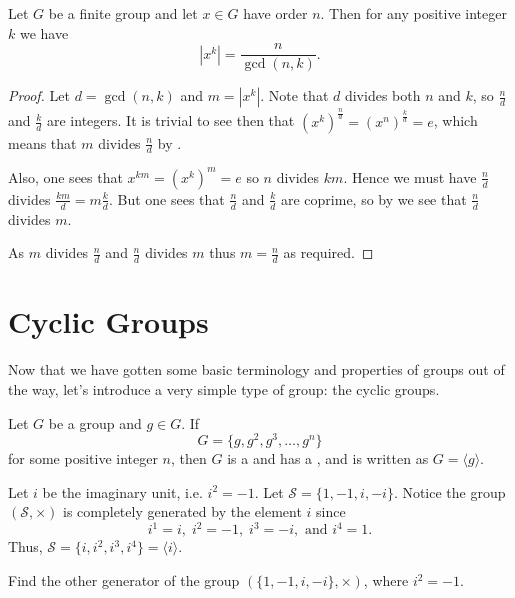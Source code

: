 \begin{theorem}\label{thrm-order-of-power-of-element}
    Let $G$ be a finite group and let $x \in G$ have order $n$. Then for any positive integer $k$ we have
    \[
        \left|x^k\right| = \frac{n}{\gcd(n,k)}.
    \]
\end{theorem}
\begin{proof}
    Let $d = \gcd(n,k)$ and $m = |x^k|$. Note that $d$ divides both $n$ and $k$, so $\frac nd$ and $\frac kd$ are integers. It is trivial to see then that $(x^k)^{\frac nd} = \left(x^n\right)^{\frac kd} = e$, which means that $m$ divides $\frac nd$ by .

    Also, one sees that $x^{km} = (x^k)^m = e$ so $n$ divides $km$. Hence we must have $\frac nd$ divides $\frac {km}{d} = m\frac kd$. But one sees that $\frac nd$ and $\frac kd$ are coprime, so by  we see that $\frac nd$ divides $m$.

    As $m$ divides $\frac nd$ and $\frac nd$ divides $m$ thus $m = \frac nd$ as required.
\end{proof}

\section{Cyclic Groups}
Now that we have gotten some basic terminology and properties of groups out of the way, let's introduce a very simple type of group: the cyclic groups.

\begin{definition}
    Let $G$ be a group and $g \in G$. If
    \[
        G = \{g, g^2, g^3, \dots, g^n\}
    \]
    for some positive integer $n$, then $G$ is a  and has a , and is written as $G = \langle g \rangle$.
\end{definition}

\begin{example}
    Let $i$ be the imaginary unit, i.e. $i^2 = -1$. Let $\mathcal{S} = \{1, -1, i, -i\}$. Notice the group $(\mathcal{S}, \times)$ is completely generated by the element $i$ since
    \[
    i^1 = i,\; i^2 = -1,\; i^3 = -i, \text{ and } i^4 = 1.
    \]
    Thus, $\mathcal{S} = \{i, i^2, i^3, i^4\} = \langle i \rangle$.
\end{example}

\begin{exercise}
    Find the other generator of the group $(\{1, -1, i, -i\}, \times)$, where $i^2 = -1$.
\end{exercise}

